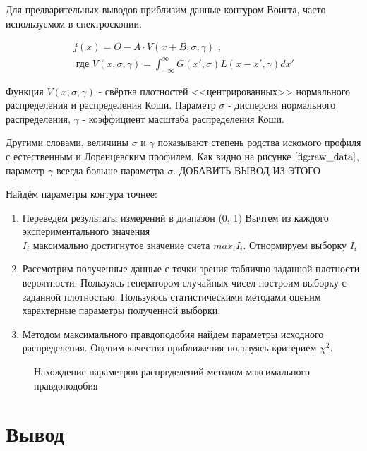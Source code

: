 \documentclass[a4paper, 14pt]{article}
\begin{document}
Для предварительных выводов приблизим данные контуром Воигта, часто
используемом в спектроскопии.

\begin{equation}
    \begin{aligned}
        f(x) = O - A \cdot V(x + B, \sigma, \gamma) \text{ ,} \\
        \text{ где } V(x, \sigma, \gamma) = \int_{- \infty}^{\infty} G(x', \sigma) L(x - x', \gamma) dx'
    \end{aligned}
    \label{approximation_fucntion_1}
\end{equation}

Функция $V(x, \sigma, \gamma)$ - свёртка плотностей <<центрированных>> нормального распределения и распределения Коши.
Параметр $\sigma$ - дисперсия нормального распределения, $\gamma$ - коэффициент масштаба распределения Коши.

Другими словами, величины $\sigma$ и $\gamma$ показывают степень родства искомого профиля с естественным и Лоренцевским профилем.
Как видно на рисунке $\ref{fig:raw_data}$, параметр $\gamma$ всегда больше параметра $\sigma$. ДОБАВИТЬ ВЫВОД ИЗ ЭТОГО


Найдём параметры контура точнее:
\begin{enumerate}
    \item Переведём результаты измерений в диапазон (0, 1)
          \subitem Вычтем из каждого экспериментального значения \\

           $I_{i}$ максимально достигнутое значение счета $max_{i} I_{i}$.
          \subitem Отнормируем выборку $I_{i}$
    \item Рассмотрим полученные данные с точки зрения таблично заданной плотности вероятности. Пользуясь генератором случайных чисел построим выборку с заданной плотностью. Пользуюсь статистическими методами
          оценим характерные параметры полученной выборки.
    \item Методом максимального правдоподобия найдем параметры исходного распределения. Оценим качество приближения
          пользуясь критерием $\chi^{2}$.
\end{enumerate}
\begin{figure}[h]
    
    \caption{Нахождение параметров распределений методом максимального правдоподобия}
\end{figure}

\newpage

\section*{\textcolor{header}{Вывод}}
\end{document}
